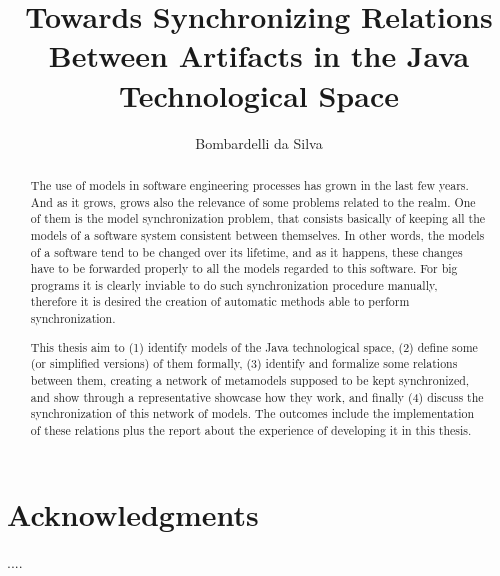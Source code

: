 \documentclass[tuberlin,cic,tc,english,noabntcite]{iiufrgs}
\title{Towards Synchronizing Relations Between Artifacts in the Java Technological Space}
\author{Bombardelli da Silva}{William}
\begin{document}
\maketitle


\chapter*{Acknowledgments}
....



\begin{abstract}
The use of models in software engineering processes has grown in the last few years. And as it grows, grows also the relevance of some problems related to the realm. One of them is the model synchronization problem, that consists basically of keeping all the models of a software system consistent between themselves. In other words, the models of a software tend to be changed over its lifetime, and as it happens, these changes have to be forwarded properly to all the models regarded to this software. For big programs it is clearly inviable to do such synchronization procedure manually, therefore it is desired the creation of automatic methods able to perform synchronization.

This thesis aim to (1) identify models of the Java technological space, (2) define some (or simplified versions) of them formally, (3) identify and formalize some relations between them, creating a network of metamodels supposed to be kept synchronized, and show through a representative showcase how they work, and finally (4) discuss the synchronization of this network of models. The outcomes include the implementation of these relations plus the report about the experience of developing it in this thesis.
\end{abstract}
\end{document}
